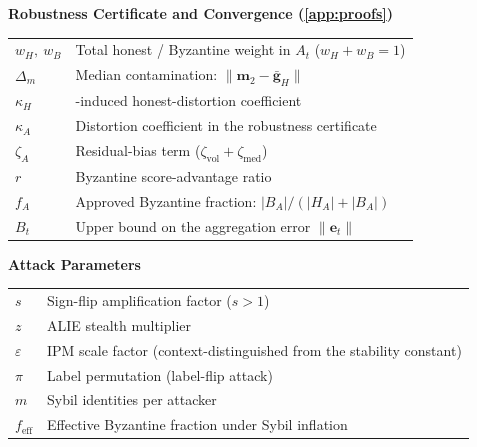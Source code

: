 \vspace{1em}
\noindent\textbf{Robustness Certificate and Convergence (\cref{app:proofs})}
\begin{tabular}{ll}
$w_H,\ w_B$ & Total honest / Byzantine weight in $A_t$ ($w_H+w_B=1$) \\
$\Delta_m$ & Median contamination: $\|\mathbf{m}_2-\bar{\mathbf{g}}_H\|$ \\
$\kappa_H$ & \aegis{}-induced honest-distortion coefficient \\
$\kappa_A$ & Distortion coefficient in the robustness certificate \\
$\zeta_A$ & Residual-bias term ($\zeta_{\text{vol}}+\zeta_{\text{med}}$) \\
$r$ & Byzantine score-advantage ratio \\
$f_A$ & Approved Byzantine fraction: $|B_A|/(|H_A|+|B_A|)$ \\
$B_t$ & Upper bound on the aggregation error $\|\mathbf{e}_t\|$ \\
\end{tabular}

\vspace{1em}
\noindent\textbf{Attack Parameters}
\begin{tabular}{ll}
$s$ & Sign-flip amplification factor ($s>1$) \\
$z$ & ALIE stealth multiplier \\
$\varepsilon$ & IPM scale factor (context-distinguished from the stability constant) \\
$\pi$ & Label permutation (label-flip attack) \\
$m$ & Sybil identities per attacker \\
$f_{\text{eff}}$ & Effective Byzantine fraction under Sybil inflation \\
\end{tabular}

